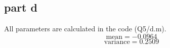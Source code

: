 \subsection{part d}
All parameters are calculated in the code (Q5/d.m).
$$
\text{mean} = -0.0964
$$
$$
\text{variance} = 0.2509
$$
